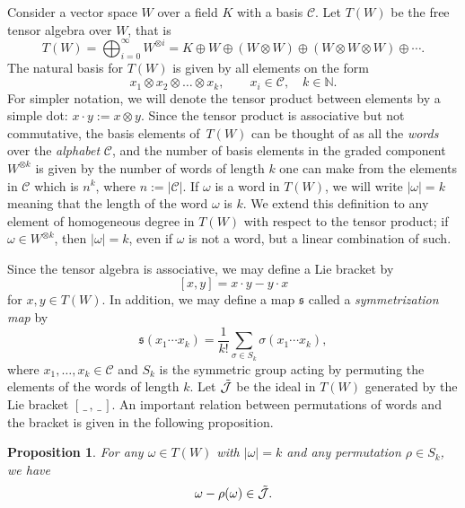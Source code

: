 \documentclass[10pt,a4paper]{amsart}
\newcommand{\noarg}{\,\_\,}
\numberwithin{equation}{section}
\newtheorem{Proposition}[Theorem]{Proposition}
 { \theoremstyle{definition}
\newtheorem{Definition}[Theorem]{Definition}
\newtheorem{Note}[Theorem]{Note}
\newtheorem{Example}[Theorem]{Example}
\newtheorem{Remark}[Theorem]{Remark} }
\begin{document}
Consider a vector space $W$ over a field $K$ with a basis $\mathcal{C}$. Let $T(W)$ be the free tensor algebra over $W$, that is
\[
T(W) = \bigoplus_{i=0}^{\infty} W^{\otimes i} = K \oplus W \oplus (W \otimes W) \oplus (W \otimes W \otimes W) \oplus \cdots .
\]
The natural basis for $T(W)$ is given by all elements on the form
\[
x_1 \otimes x_2 \otimes \dots \otimes x_k, \qquad x_i \in \mathcal{C}, \quad k\in \mathbb{N}.
\]
For simpler notation, we will denote the tensor product between elements by a simple dot: $x \cdot y := x \otimes y$. Since the tensor product is associative but not commutative, the basis elements of~$T(W)$ can be thought of as all the \emph{words} over the \emph{alphabet} $\mathcal{C}$, and the number of basis elements in the graded component $W^{\otimes k}$ is given by the number of words of length $k$ one can make from the elements in $\mathcal{C}$ which is $n^k$, where $n:= |\mathcal{C}|$. If $\omega$ is a word in $T(W)$, we will write $|\omega|=k$ meaning that the length of the word $\omega$ is $k$. We extend this definition to any element of homogeneous degree in $T(W)$ with respect to the tensor product; if $\omega \in W^{\otimes k}$, then $|\omega|=k$, even if $\omega$ is not a word, but a linear combination of such.

Since the tensor algebra is associative, we may define a Lie bracket by
\begin{equation}\label{eq:tensor_bracket}
 [x,y] = x\cdot y - y \cdot x
\end{equation}
for $x,y \in T(W)$. In addition, we may define a map $\mathfrak{s}$ called a \emph{symmetrization map} by
\begin{equation*}%
 \mathfrak{s}(x_1 \cdots x_k) = \frac{1}{k!} \sum_{\sigma \in S_k} \sigma(x_1 \cdots x_k),
\end{equation*}
where $x_1, \dots, x_k \in \mathcal{C}$ and $S_k$ is the symmetric group acting by permuting the elements of the words of length $k$. Let $\Tilde{\mathcal{J}}$ be the ideal in $T(W)$ generated by the Lie bracket $[\noarg , \noarg]$. An important relation between permutations of words and the bracket is given in the following proposition.

\begin{Proposition}\label{prop:perm}
 For any $\omega \in T(W)$ with $|\omega| = k$ and any permutation $\rho \in S_k$, we have
 \[
 \omega - \rho(\omega) \in \Tilde{\mathcal{J}}.
 \]
\end{Proposition}
\end{document}
